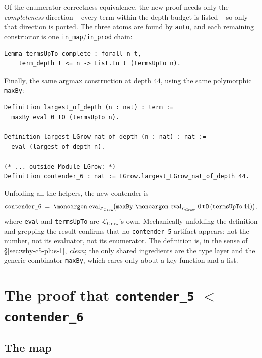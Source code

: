 \documentclass[11pt,a4paper]{article}
\theoremstyle{plain}
\theoremstyle{definition}
\theoremstyle{remark}
\newcommand{\opname}[1]{\mathop{\text{\monoargon #1}}\nolimits}
\newcommand{\eval}{\opname{eval}}
\begin{document}
Of the enumerator-correctness equivalence, the new proof needs only
the \emph{completeness} direction -- every term within the depth
budget is listed -- so only that direction is ported.  The three
atoms are found by \texttt{auto}, and each remaining constructor is
one \texttt{in\_map}/\texttt{in\_prod} chain:

\begin{lstlisting}
Lemma termsUpTo_complete : forall n t,
    term_depth t <= n -> List.In t (termsUpTo n).
\end{lstlisting}

Finally, the same argmax construction at depth $44$, using the same
polymorphic \texttt{maxBy}:

\begin{lstlisting}
Definition largest_of_depth (n : nat) : term :=
  maxBy eval 0 tO (termsUpTo n).

Definition largest_LGrow_nat_of_depth (n : nat) : nat :=
  eval (largest_of_depth n).

(* ... outside Module LGrow: *)
Definition contender_6 : nat := LGrow.largest_LGrow_nat_of_depth 44.
\end{lstlisting}

Unfolding all the helpers, the new contender is
\[
  \texttt{contender\_6}
  \;=\;
  \eval_{\mathcal{L}_{\textrm{Grow}}}\!\bigl(\texttt{maxBy}\,
                       \eval_{\mathcal{L}_{\textrm{Grow}}}\,0\,
                       \texttt{tO}\,(\texttt{termsUpTo}\,44)\bigr),
\]
where \texttt{eval} and \texttt{termsUpTo} are
$\mathcal{L}_{\textrm{Grow}}$'s own.  Mechanically unfolding the
definition and grepping the result confirms that no
\texttt{contender\_5} artifact appears: not the number, not its
evaluator, not its enumerator.  The definition is, in the sense of
\S\ref{sec:why-c5-plus-1}, \emph{clean}; the only shared ingredients
are the type layer and the generic combinator \texttt{maxBy}, which
cares only about a key function and a list.

\section{The proof that \texttt{contender\_5} $<$ \texttt{contender\_6}}
\label{sec:proof}

\subsection{The map}
\end{document}
